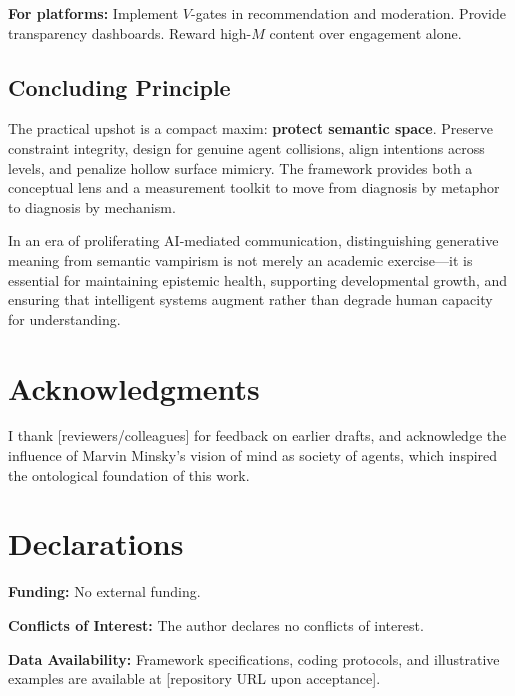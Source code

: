 \documentclass[12pt]{article}
\begin{document}
\textbf{For platforms:} Implement $V$-gates in recommendation and moderation. Provide transparency dashboards. Reward high-$M$ content over engagement alone.

\subsection{Concluding Principle}

The practical upshot is a compact maxim: \textbf{protect semantic space}. Preserve constraint integrity, design for genuine agent collisions, align intentions across levels, and penalize hollow surface mimicry. The framework provides both a conceptual lens and a measurement toolkit to move from diagnosis by metaphor to diagnosis by mechanism.

In an era of proliferating AI-mediated communication, distinguishing generative meaning from semantic vampirism is not merely an academic exercise—it is essential for maintaining epistemic health, supporting developmental growth, and ensuring that intelligent systems augment rather than degrade human capacity for understanding.

\section*{Acknowledgments}

I thank [reviewers/colleagues] for feedback on earlier drafts, and acknowledge the influence of Marvin Minsky's vision of mind as society of agents, which inspired the ontological foundation of this work.

\section*{Declarations}

\textbf{Funding:} No external funding.

\textbf{Conflicts of Interest:} The author declares no conflicts of interest.

\textbf{Data Availability:} Framework specifications, coding protocols, and illustrative examples are available at [repository URL upon acceptance].
\end{document}
